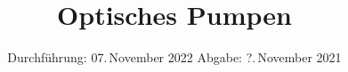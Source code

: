 

\subject{V21}
\title{Optisches Pumpen}
\date{%
  Durchführung: 07.\,November 2022
  \hspace{2em}
  Abgabe: ?.\,November 2021
}



\maketitle
\thispagestyle{empty}
\tableofcontents
\newpage







\newpage
\printbibliography{}


